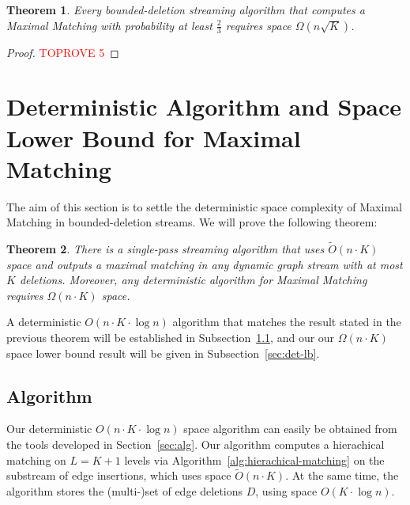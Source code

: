 \documentclass[11pt,a4paper]{article}
\newtheorem{theorem}{Theorem}
\begin{document}
\setcounter{thmsaved}{\value{theorem}}
\setcounter{theorem}{\value{counterLB}}
\addtocounter{theorem}{-1}

\begin{theorem}
    Every bounded-deletion streaming algorithm that computes a \textsf{Maximal Matching} with probability at least $\frac{2}{3}$ requires space $\Omega( n \sqrt{K})$.
\end{theorem}
\setcounter{theorem}{\value{thmsaved}}
\addtocounter{theorem}{-1}
\begin{proof}\textcolor{red}{TOPROVE 5}\end{proof}




\section{Deterministic Algorithm and Space Lower Bound for \textsf{Maximal Matching}} \label{sec:det}

The aim of this section is to settle the deterministic space complexity of \textsf{Maximal Matching} in bounded-deletion streams. We will prove the following theorem:


\setcounter{thmsaved}{\value{theorem}}
\setcounter{theorem}{\value{counterDET}}
\addtocounter{theorem}{-1}
\begin{theorem}
There is a single-pass streaming algorithm that uses $\tilde{O}(n \cdot K)$ space and outputs a maximal matching in any dynamic graph stream with at most $K$ deletions. Moreover, any deterministic algorithm for \textsf{Maximal Matching} requires $\Omega(n \cdot K)$ space.
\end{theorem}
\setcounter{theorem}{\value{thmsaved}}

A deterministic $O(n \cdot K \cdot \log n)$ algorithm that matches the result stated in the previous theorem will be established in Subsection~\ref{sec:det-alg}, and our our $\Omega(n \cdot K)$ space lower bound result will be given in Subsection~\ref{sec:det-lb}.

\subsection{Algorithm} \label{sec:det-alg}
Our deterministic $O(n \cdot K \cdot \log n)$ space algorithm can easily be obtained from the tools developed in Section~\ref{sec:alg}. Our algorithm computes a hierachical matching on $L=K+1$ levels via Algorithm~\ref{alg:hierachical-matching} on the substream of edge insertions, which uses space $\tilde{O}(n \cdot K)$. At the same time, the algorithm stores the (multi-)set of edge deletions $D$, using space $O(K \cdot \log n)$. 
\end{document}
